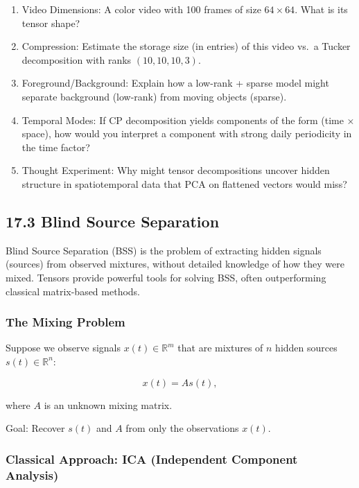 \documentclass[
  letterpaper,
  DIV=11,
  numbers=noendperiod]{scrreprt}
\begin{document}
\begin{enumerate}
\def\labelenumi{\arabic{enumi}.}
\item
  Video Dimensions: A color video with 100 frames of size
  \(64 \times 64\). What is its tensor shape?
\item
  Compression: Estimate the storage size (in entries) of this video
  vs.~a Tucker decomposition with ranks \((10, 10, 10, 3)\).
\item
  Foreground/Background: Explain how a low-rank + sparse model might
  separate background (low-rank) from moving objects (sparse).
\item
  Temporal Modes: If CP decomposition yields components of the form
  (time × space), how would you interpret a component with strong daily
  periodicity in the time factor?
\item
  Thought Experiment: Why might tensor decompositions uncover hidden
  structure in spatiotemporal data that PCA on flattened vectors would
  miss?
\end{enumerate}

\subsection{17.3 Blind Source Separation}\label{blind-source-separation}

Blind Source Separation (BSS) is the problem of extracting hidden
signals (sources) from observed mixtures, without detailed knowledge of
how they were mixed. Tensors provide powerful tools for solving BSS,
often outperforming classical matrix-based methods.

\subsubsection{The Mixing Problem}\label{the-mixing-problem}

Suppose we observe signals \(x(t) \in \mathbb{R}^m\) that are mixtures
of \(n\) hidden sources \(s(t) \in \mathbb{R}^n\):

\[
x(t) = A s(t),
\]

where \(A\) is an unknown mixing matrix.

Goal: Recover \(s(t)\) and \(A\) from only the observations \(x(t)\).

\subsubsection{Classical Approach: ICA (Independent Component
Analysis)}\label{classical-approach-ica-independent-component-analysis}
\end{document}
